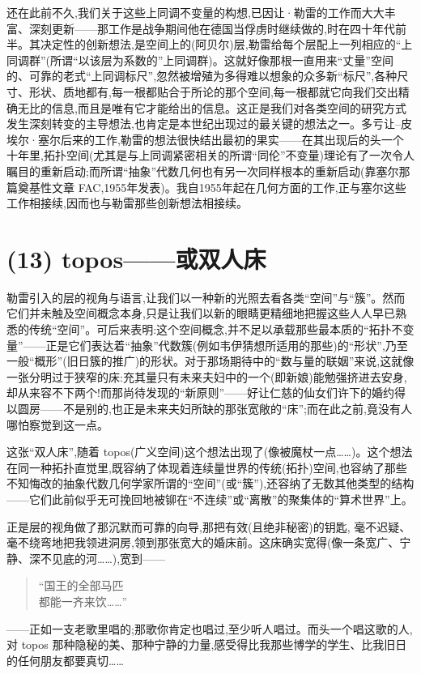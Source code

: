 
 还在此前不久,我们关于这些上同调不变量的构想,已因让·勒雷的工作而大大丰富、深刻更新——那工作是战争期间他在德国当俘虏时继续做的,时在四十年代前半。其决定性的创新想法,是空间上的(阿贝尔)层,勒雷给每个层配上一列相应的“上同调群”(所谓“以该层为系数的”上同调群)。这就好像那根一直用来“丈量”空间的、可靠的老式“上同调标尺”,忽然被增殖为多得难以想象的众多新“标尺”,各种尺寸、形状、质地都有,每一根都贴合于所论的那个空间,每一根都就它向我们交出精确无比的信息,而且是唯有它才能给出的信息。这正是我们对各类空间的研究方式发生深刻转变的主导想法,也肯定是本世纪出现过的最关键的想法之一。多亏让–皮埃尔·塞尔后来的工作,勒雷的想法很快结出最初的果实——在其出现后的头一个十年里,拓扑空间(尤其是与上同调紧密相关的所谓“同伦”不变量)理论有了一次令人瞩目的重新启动;而所谓“抽象”代数几何也有另一次同样根本的重新启动(靠塞尔那篇奠基性文章 FAC,1955年发表)。我自1955年起在几何方面的工作,正与塞尔这些工作相接续,因而也与勒雷那些创新想法相接续。

\section{(13) topos——或双人床}

勒雷引入的层的视角与语言,让我们以一种新的光照去看各类“空间”与“簇”。然而它们并未触及空间概念本身,只是让我们以新的眼睛更精细地把握这些人人早已熟悉的传统“空间”。可后来表明:这个空间概念,并不足以承载那些最本质的“拓扑不变量”——正是它们表达着“抽象”代数簇(例如韦伊猜想所适用的那些)的“形状”,乃至一般“概形”(旧日簇的推广)的形状。对于那场期待中的“数与量的联姻”来说,这就像一张分明过于狭窄的床:充其量只有未来夫妇中的一个(即新娘)能勉强挤进去安身,却从来容不下两个!而那尚待发现的“新原则”——好让仁慈的仙女们许下的婚约得以圆房——不是别的,也正是未来夫妇所缺的那张宽敞的“床”;而在此之前,竟没有人哪怕察觉到这一点。

这张“双人床”,随着 topos(广义空间)这个想法出现了(像被魔杖一点……)。这个想法在同一种拓扑直觉里,既容纳了体现着连续量世界的传统(拓扑)空间,也容纳了那些不知悔改的抽象代数几何学家所谓的“空间”(或“簇”),还容纳了无数其他类型的结构——它们此前似乎无可挽回地被铆在“不连续”或“离散”的聚集体的“算术世界”上。

正是层的视角做了那沉默而可靠的向导,那把有效(且绝非秘密)的钥匙,
 毫不迟疑、毫不绕弯地把我领进洞房,领到那张宽大的婚床前。这床确实宽得(像一条宽广、宁静、深不见底的河……),宽到——
\begin{quote}
“国王的全部马匹\\
都能一齐来饮……”
\end{quote}
——正如一支老歌里唱的;那歌你肯定也唱过,至少听人唱过。而头一个唱这歌的人,对 topos 那种隐秘的美、那种宁静的力量,感受得比我那些博学的学生、比我旧日的任何朋友都要真切……

